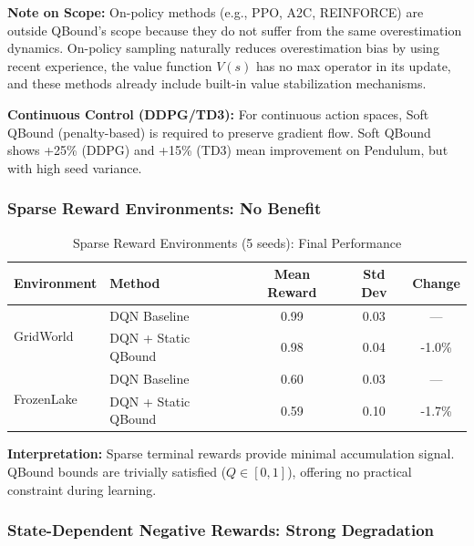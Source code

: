 \documentclass[11pt]{article}
\theoremstyle{definition}
\theoremstyle{remark}
\begin{document}
\textbf{Note on Scope:} On-policy methods (e.g., PPO, A2C, REINFORCE) are outside QBound's scope because they do not suffer from the same overestimation dynamics. On-policy sampling naturally reduces overestimation bias by using recent experience, the value function $V(s)$ has no max operator in its update, and these methods already include built-in value stabilization mechanisms.

\textbf{Continuous Control (DDPG/TD3):} For continuous action spaces, Soft QBound (penalty-based) is required to preserve gradient flow. Soft QBound shows +25\% (DDPG) and +15\% (TD3) mean improvement on Pendulum, but with high seed variance.

\subsubsection{Sparse Reward Environments: No Benefit}

\begin{table}[h]
\centering
\caption{Sparse Reward Environments (5 seeds): Final Performance}
\label{tab:sparse-rewards}
\begin{tabular}{llccc}
\toprule
Environment & Method & Mean Reward & Std Dev & Change \\
\midrule
\multirow{2}{*}{GridWorld} & DQN Baseline & 0.99 & 0.03 & --- \\
& DQN + Static QBound & 0.98 & 0.04 & -1.0\% \\
\midrule
\multirow{2}{*}{FrozenLake} & DQN Baseline & 0.60 & 0.03 & --- \\
& DQN + Static QBound & 0.59 & 0.10 & -1.7\% \\
\bottomrule
\end{tabular}
\end{table}

\textbf{Interpretation:} Sparse terminal rewards provide minimal accumulation signal. QBound bounds are trivially satisfied ($Q \in [0,1]$), offering no practical constraint during learning.

\subsubsection{State-Dependent Negative Rewards: Strong Degradation}
\end{document}
